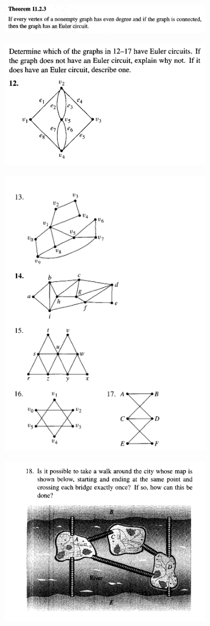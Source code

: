 \documentclass{article}
\begin{document}
\begin{figure}
\centering
\includegraphics[width=90mm]{5}
\end{figure}

\begin{figure}
\centering
\includegraphics[width=90mm]{6}
\end{figure}

\begin{figure}
\centering
\includegraphics[width=90mm]{7}
\end{figure}

\begin{figure}
\centering
\includegraphics[width=90mm]{8}
\end{figure}
\end{document}
